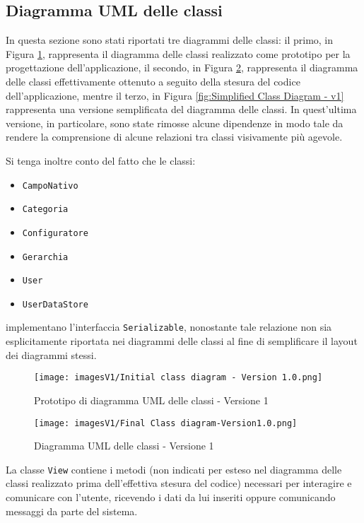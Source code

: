 \newpage
\subsection{Diagramma UML delle classi}
In questa sezione sono stati riportati tre diagrammi delle classi: il primo, in Figura \ref{fig:Initial Class diagram - v1}, rappresenta il diagramma delle classi realizzato come prototipo per la progettazione dell'applicazione, il secondo, in Figura \ref{fig:Class diagram - v1}, rappresenta il diagramma delle classi effettivamente ottenuto a seguito della stesura del codice dell'applicazione, mentre il terzo, in Figura \ref{fig:Simplified Class Diagram - v1} rappresenta una versione semplificata del diagramma delle classi. In quest'ultima versione, in particolare, sono state rimosse alcune dipendenze in modo tale da rendere la comprensione di alcune relazioni tra classi visivamente più agevole.

Si tenga inoltre conto del fatto che le classi:
\begin{itemize}
    \item \texttt{CampoNativo}
    \item \texttt{Categoria}
    \item \texttt{Configuratore}
    \item \texttt{Gerarchia}
    \item \texttt{User}
    \item \texttt{UserDataStore}
\end{itemize}
implementano l'interfaccia \texttt{Serializable}, nonostante tale relazione non sia esplicitamente riportata nei diagrammi delle classi al fine di semplificare il layout dei diagrammi stessi.

\begin{figure}[hb]
    \centering
    \texttt{[image: imagesV1/Initial class diagram - Version 1.0.png]}
    \caption{\label{fig:Initial Class diagram - v1}Prototipo di diagramma UML delle classi - Versione 1}
\end{figure}

\begin{figure}[h!]
    \centering
    \texttt{[image: imagesV1/Final Class diagram-Version1.0.png]}
    \caption{\label{fig:Class diagram - v1}Diagramma UML delle classi - Versione 1}
\end{figure}    

La classe \texttt{View} contiene i metodi (non indicati per esteso nel diagramma delle classi realizzato prima dell'effettiva stesura del codice) necessari per interagire e comunicare con l'utente, ricevendo i dati da lui inseriti oppure comunicando messaggi da parte del sistema.

